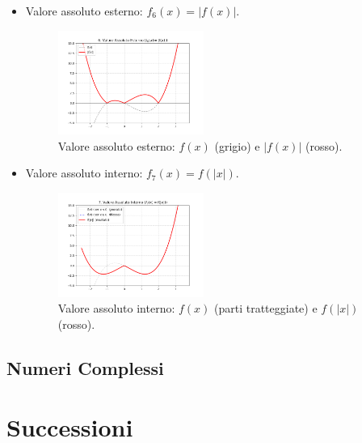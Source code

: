 \documentclass[oneside,10pt]{book} %
\begin{document}
\begin{itemize}
\item Valore assoluto esterno: $f_6(x) = |f(x)|$.
    \begin{figure}[H]
    \centering
    \includegraphics[width=0.45\textwidth]{img/valore_assoluto_esterno.png}
    \caption{Valore assoluto esterno: $f(x)$ (grigio) e $|f(x)|$ (rosso).}
  \end{figure}

\item Valore assoluto interno: $f_7(x) = f(|x|)$.
    \begin{figure}[H]
    \centering
    \includegraphics[width=0.45\textwidth]{img/valore_assoluto_interno.png}
    \caption{Valore assoluto interno: $f(x)$ (parti tratteggiate) e $f(|x|)$ (rosso).}
  \end{figure}
\end{itemize}

\section{Numeri Complessi}
\chapter{Successioni}
\end{document}
